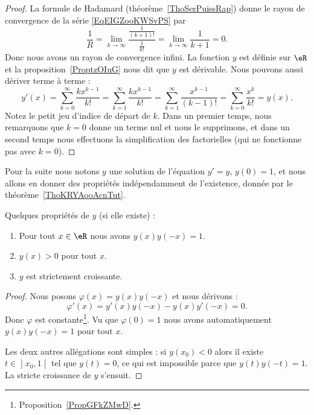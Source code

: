 \begin{proof}
    La formule de Hadamard (théorème~\ref{ThoSerPuissRap}) donne le rayon de convergence de la série \eqref{EqEIGZooKWSvPS} par
    \begin{equation}
        \frac{1}{ R }=\lim_{k\to \infty} \frac{ \frac{1}{ (k+1)! } }{ \frac{1}{ k! } }=\lim_{k\to \infty} \frac{1}{ k+1 }=0.
    \end{equation}
    Donc nous avons un rayon de convergence infini. La fonction \( y\) est définie sur \( \eR\) et la proposition~\ref{ProptzOIuG} nous dit que \( y\) est dérivable. Nous pouvons aussi dériver terme à terme :
    \begin{equation}
            y'(x)=\sum_{k=0}^{\infty}\frac{ kx^{k-1} }{ k! }=\sum_{k=1}^{\infty}\frac{ kx^{k-1} }{ k! }=\sum_{k=1}^{\infty}\frac{ x^{k-1} }{ (k-1)! }=\sum_{k=0}^{\infty}\frac{ x^k }{ k! }=y(x).
    \end{equation}
    Notez le petit jeu d'indice de départ de \( k\). Dans un premier temps, nous remarquons que \( k=0\) donne un terme nul et nous le supprimons, et dans un second temps nous effectuons la simplification des factorielles (qui ne fonctionne pas avec \( k=0\)).
\end{proof}

Pour la suite nous notons \( y\) une solution de l'équation \( y'=y\), \( y(0)=1\), et nous allons en donner des propriétés indépendamment de l'existence, donnée par le théorème~\ref{ThoKRYAooAcnTut}.

\begin{proposition} \label{PropTLECooEiLbPP}
    Quelques propriétés de \( y\) (si elle existe) :
    \begin{enumerate}
        \item
            Pour tout \( x\in \eR\) nous avons \( y(x)y(-x)=1\).
        \item
            \( y(x)>0\) pour tout \( x\).
        \item
            \( y\) est strictement croissante.
    \end{enumerate}
\end{proposition}

\begin{proof}
    Nous posons \( \varphi(x)=y(x)y(-x)\) et nous dérivons :
    \begin{equation}
        \varphi'(x)=y'(x)y(-x)-y(x)y'(-x)=0.
    \end{equation}
    Donc \( \varphi\) est constante\footnote{Proposition~\ref{PropGFkZMwD}.}. Vu que \( \varphi(0)=1\) nous avons automatiquement \( y(x)y(-x)=1\) pour tout \( x\).

Les deux autres allégations sont simples : si \( y(x_0)<0\) alors il existe \( t\in\mathopen] x_0 , 1 \mathclose[\) tel que \( y(t)=0\), ce qui est impossible parce que \( y(t)y(-t)=1\). La stricte croissance de \( y\) s'ensuit.
\end{proof}


